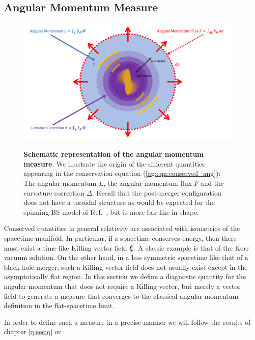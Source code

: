 \subsection{Angular Momentum Measure}\label{ag:sec:methods}

\begin{figure}[h!]
\begin{center}
    {\includegraphics[width=0.75\columnwidth]{ag_fig/FigureRobinPaper.png}}
\caption{{\bf Schematic representation of the angular momentum measure}: We illustrate the origin of the different quantities
appearing in the conservation equation
(\ref{ag:eqn:conserved_ang}): The angular momentum
    ${L}$, the {angular momentum flux} $F$ and the
    curvature correction ${\Delta}$. Recall that the post-merger
    configuration does not have a toroidal structure
    as would be expected for the spinning BS model of
    Ref.~\cite{PhysRevD.90.024068,Yoshida:1997qf}, but is more bar-like in shape.
    }
\label{ag:fig:AngMomTrick}
\end{center}
\end{figure}

Conserved quantities in general relativity are associated with isometries of the spacetime manifold. In particular, if a spacetime conserves energy, then there must exist a time-like Killing vector field $\boldsymbol{\xi}$. A classic example is that of the Kerr vacuum solution. On the other hand, in a less symmetric spacetime like that of a black-hole merger, such a Killing vector field does not usually exist except in the asymptotically flat region. In this section we define a diagnostic quantity for the angular momentum that does not require a Killing vector, but merely a vector field to generate a measure that
converges to the classical angular momentum definition
in the flat-spacetime limit.

In order to define such a measure in a
precise manner we will follow the results of chapter \ref{q:sec:q} or \cite{Croft:2022gks,Clough:2021qlv}.



